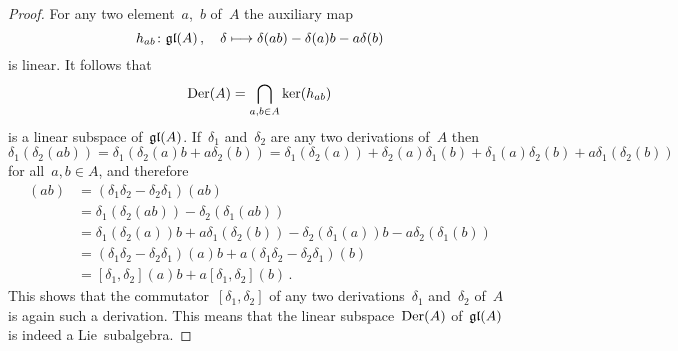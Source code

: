 \begin{proof}
  For any two element~$a$,~$b$ of~$A$ the auxiliary map
  \[
    h_{ab}
    \colon
    \gllie(A) \,,
    \quad
    \delta
    \mapsto
    \delta(ab) - \delta(a)b - a \delta(b)
  \]
  is linear.
  It follows that
  \[
    \operatorname{Der}(A)
    =
    \bigcap_{a, b \in A}
    \ker( h_{ab} )
  \]
  is a linear subspace of~$\mathfrak{gl}(A)$.
  If~$\delta_1$ and~$\delta_2$ are any two derivations of~$A$ then
  \[
    \delta_1( \delta_2(ab) )
    =
    \delta_1( \delta_2(a) b + a \delta_2(b) )
    =
    \delta_1(\delta_2(a)) + \delta_2(a) \delta_1(b)
    + \delta_1(a) \delta_2(b) + a \delta_1( \delta_2(b) )
  \]
  for all~$a, b \in A$, and therefore
  \begin{align*}
    [\delta_1, \delta_2](ab)
    &=
    (\delta_1 \delta_2 - \delta_2 \delta_1)(ab)
    \\
    &=
    \delta_1( \delta_2(ab) ) - \delta_2( \delta_1(ab) )
    \\
    &=
    \delta_1(\delta_2(a)) b + a \delta_1(\delta_2(b))
    - \delta_2(\delta_1(a)) b - a \delta_2(\delta_1(b))
    \\
    &=
    (\delta_1 \delta_2 - \delta_2 \delta_1)(a) b
    + a (\delta_1 \delta_2 - \delta_2 \delta_1)(b)
    \\
    &=
    [\delta_1, \delta_2](a) b + a [\delta_1, \delta_2](b) \,.
  \end{align*}
  This shows that the commutator~$[\delta_1, \delta_2]$ of any two derivations~$\delta_1$ and~$\delta_2$ of~$A$ is again such a derivation.
  This means that the linear subspace~$\operatorname{Der}(A)$ of~$\mathfrak{gl}(A)$ is indeed a Lie~subalgebra.
\end{proof}


